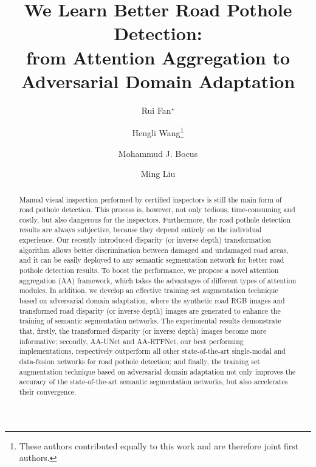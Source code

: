 \documentclass[runningheads]{llncs}
\begin{document}
\pagestyle{headings}\mainmatter{}

\title{We Learn Better Road Pothole Detection:\\from Attention Aggregation to\\ Adversarial Domain Adaptation}


\author{Rui Fan$^\star$ \and
    Hengli Wang\thanks{These authors contributed equally to this work and are therefore joint first authors.} \and
    Mohammud J. Bocus \and Ming Liu}

\maketitle

\begin{abstract}
Manual visual inspection performed by certified inspectors is still the main form of road pothole detection. This process is, however, not only tedious, time-consuming and costly, but also dangerous for the inspectors. Furthermore, the road pothole detection results are always subjective, because they depend entirely on the individual experience. Our recently introduced disparity (or inverse depth) transformation algorithm allows better discrimination between damaged and undamaged road areas, and it can be easily deployed to any semantic segmentation network for better road pothole detection results. To boost the performance, we propose a novel attention aggregation (AA) framework, which takes the advantages of different types of attention modules. In addition, we develop an effective training set augmentation technique based on adversarial domain adaptation, where the synthetic road RGB images and transformed road disparity (or inverse depth) images are generated to enhance the training of semantic segmentation networks. The experimental results demonstrate that, firstly, the transformed disparity (or inverse depth) images become more informative; secondly, AA-UNet and AA-RTFNet, our best performing implementations, respectively outperform all other state-of-the-art single-modal and data-fusion networks for road pothole detection; and finally, the training set augmentation technique based on adversarial domain adaptation not only improves the accuracy of the state-of-the-art semantic segmentation networks, but also accelerates their convergence.


\end{abstract}
\end{document}
